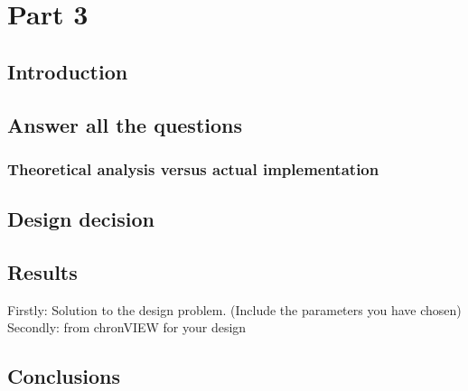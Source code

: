 \chapter{Part 3}

\section{Introduction}

\section{Answer all the questions}

\subsection{Theoretical analysis versus actual implementation}


\section{Design decision}

\section{Results}

Firstly: Solution to the design problem. (Include the parameters you have chosen)\\
Secondly: from chronVIEW for your design

\section{Conclusions}